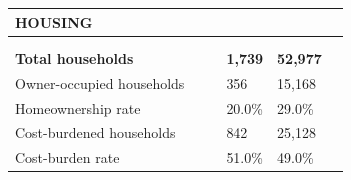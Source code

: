\documentclass[9pt]{report}
\begin{document}
\vspace{12pt}
\setlength{\tabcolsep}{.01in} %
\begin{tabular}{p{.10in}p{.10in}p{.10in}p{3.7in}>{\hfill}p{.85in}>{\hfill}p{.85in}>{\hfill}p{.85in}>{\hfill}p{.85in}p{0.1in}}
\multicolumn{9}{l}{\parbox{7.1in}{\raggedright{\large{\strut\textbf{HOUSING}\strut}}}} \\ 
\hline
\multicolumn{4}{l}{\parbox{3.5in}{\raggedright{\textbf{}}}} & \multicolumn{1}{r}{\parbox{.85in}{\strut\raggedleft{\textbf{}\strut}}} & \multicolumn{1}{r}{\parbox{.85in}{\strut\raggedleft{\textbf{}\strut}}} & \multicolumn{1}{r}{\parbox{.85in}{\strut{}}} & \multicolumn{1}{r}{\parbox{.85in}{\strut{}}} & \\ 
\multicolumn{9}{l}{} \\ 
\multicolumn{4}{l}{\parbox{3.5in}{\strut\raggedright{\textbf{Total households}\strut}}} & \textbf{} & \textbf{} & \textbf{1,739} & \textbf{52,977} & \textbf{} \\ 
\multicolumn{4}{l}{\parbox{3.6in}{\strut\raggedright{{Owner-occupied households}}\strut}} &  &  & 356 & 15,168 & \multicolumn{1}{l}{}  \\ 
\multicolumn{4}{l}{\parbox{3.6in}{\strut\raggedright{{Homeownership rate}}\strut}} &  &  & 20.0\% & 29.0\% & \multicolumn{1}{l}{}  \\ 
\multicolumn{4}{l}{\parbox{3.6in}{\strut\raggedright{{Cost-burdened households}}\strut}} &  &  & 842 & 25,128 & \multicolumn{1}{l}{}  \\ 
\multicolumn{4}{l}{\parbox{3.6in}{\strut\raggedright{{Cost-burden rate}}\strut}} &  &  & 51.0\% & 49.0\% & \multicolumn{1}{l}{}  \\ 

\end{tabular}
\setlength{\tabcolsep}{6pt} %
\end{document}

